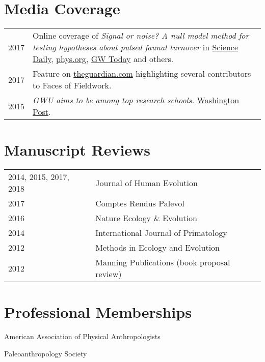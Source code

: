 \documentclass{article}
\newenvironment{mylist}
{\begin{description}[style=unboxed,leftmargin=1.3cm]}
{\end{description}}
\begin{document}
\section*{Media Coverage}
\begin{longtable}{p{}p{}}
2017 &  Online coverage of \emph{Signal or noise? A null model method for testing hypotheses about pulsed faunal turnover} in \href{https://www.sciencedaily.com/releases/2017/08/170804100410.htm}{Science Daily}, \href{https://phys.org/news/2017-08-paper-genus-homo-response-environmental.html}{phys.org}, \href{https://gwtoday.gwu.edu/origin-human-genus-may-have-occurred-chance}{GW Today} and others. \\[4pt]
2017 & Feature on \href{https://www.theguardian.com/lifeandstyle/2017/jul/01/pregnant-in-the-field-blog-photography-have-trowel-will-travel}{theguardian.com} highlighting several contributors to Faces of Fieldwork.\\[4pt]
2015 & \emph{GWU aims to be among top research schools.} \href{http://www.washingtonpost.com/local/education/gwu-aims-to-be-among-top-research-schools/2015/03/03/491da24e-c1f1-11e4-9ec2-b418f57a4a99_gallery.html}{Washington Post}.\\
\end{longtable}

\section*{Manuscript Reviews}
\begin{tabular}{l l}
2014, 2015, 2017, 2018 & Journal of Human Evolution\\[4pt]
2017 & Comptes Rendus Palevol\\[4pt]
2016 & Nature Ecology \& Evolution\\[4pt]
2014 & International Journal of Primatology\\[4pt]
2012 & Methods in Ecology and Evolution\\[4pt]
2012 & Manning Publications (book proposal review)\\
\end{tabular}

\section*{Professional Memberships}
\begin{mylist}
\item[] American Association of Physical Anthropologists
\item[] Paleoanthropology Society
\end{mylist}
\end{document}
